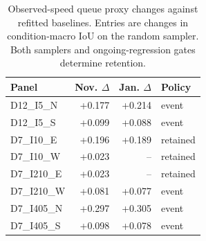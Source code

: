 \begin{table}[t]\centering
\caption{Observed-speed queue proxy changes against refitted baselines. Entries are changes in condition-macro IoU on the random sampler. Both samplers and ongoing-regression gates determine retention.}
\label{tab:eventqueues}
\begin{tabular}{lrrl}\hline
Panel & Nov. $\Delta$ & Jan. $\Delta$ & Policy \\ \hline
D12\_I5\_N & +0.177 & +0.214 & event \\
D12\_I5\_S & +0.099 & +0.088 & event \\
D7\_I10\_E & +0.196 & +0.189 & retained \\
D7\_I10\_W & +0.023 & -- & retained \\
D7\_I210\_E & +0.023 & -- & retained \\
D7\_I210\_W & +0.081 & +0.077 & event \\
D7\_I405\_N & +0.297 & +0.305 & event \\
D7\_I405\_S & +0.098 & +0.078 & event \\
\hline\end{tabular}\end{table}
